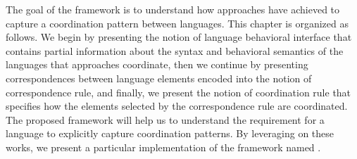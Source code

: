 The goal of the framework is to understand how approaches have achieved to capture a coordination pattern between languages. This chapter is organized as follows. We begin by presenting the notion of language behavioral interface that contains partial information about the syntax and behavioral semantics of the languages that approaches coordinate, then we continue by presenting correspondences between language elements encoded into the notion of correspondence rule, and finally, we present the notion of coordination rule that specifies how the elements selected by the correspondence rule are coordinated. The proposed framework will help us to understand the requirement for a language to explicitly capture coordination patterns. By leveraging on these works, we present a particular implementation of the framework named \bcool.   

